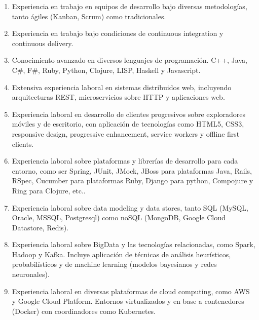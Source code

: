 \documentclass[a4paper,11pt]{article}
\begin{document}
\begin{enumerate}

  \item Experiencia en trabajo en equipos de desarrollo bajo diversas
    metodologías, tanto ágiles (Kanban, Scrum) como tradicionales.

  \item Experiencia en trabajo bajo condiciones de continuous integration y
    continuous delivery.

  \item Conocimiento avanzado en diversos lenguajes de programación. C++,
    Java, C\#, F\#, Ruby, Python, Clojure, LISP, Haskell y Javascript.

  \item Extensiva experiencia laboral en sistemas distribuidos web, incluyendo
    arquitecturas REST, microservicios sobre HTTP y aplicaciones web.

  \item Experiencia laboral en desarrollo de clientes progresivos sobre
    exploradores móviles y de escritorio, con aplicación de tecnologías como
    HTML5, CSS3, responsive design, progressive enhancement, service workers y
    offline first clients.

  \item Experiencia laboral sobre plataformas y librerías de desarrollo para
    cada entorno, como ser Spring, JUnit, JMock, JBoss para plataformas Java,
    Rails, RSpec, Cucumber para plataformas Ruby, Django para python, Compojure y Ring para
    Clojure, etc..

  \item Experiencia laboral sobre data modeling y data stores, tanto SQL
    (MySQL, Oracle, MSSQL, Postgresql) como noSQL (MongoDB, Google Cloud
    Datastore, Redis).

  \item Experiencia laboral sobre BigData y las tecnologías relacionadas, como
    Spark, Hadoop y Kafka. Incluye aplicación de técnicas de análisis
    heurísticos, probabilísticos y de machine learning (modelos bayesianos y
    redes neuronales).

  \item Experiencia laboral en diversas plataformas de cloud computing, como
    AWS y Google Cloud Platform. Entornos virtualizados y en base a
      contenedores (Docker) con coordinadores como Kubernetes.

\end{enumerate}
\end{document}
